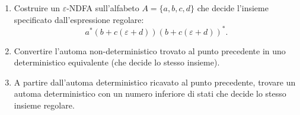 \begin{ex}
\begin{enumerate}
    \item Costruire un $\varepsilon$-NDFA sull'alfabeto $A=\{a,b,c,d\}$ che decide l'insieme specificato dall'espressione regolare:
    \[
        a^*(b+c(\varepsilon+d))(b+c(\varepsilon+d))^*.
    \]
    \item Convertire l'automa non-deterministico trovato al punto precedente in uno deterministico equivalente (che decide lo stesso insieme).
    \item A partire dall'automa deterministico ricavato al punto precedente, trovare un automa deterministico con un numero inferiore di stati che decide lo stesso insieme regolare.
\end{enumerate}
\end{ex}

